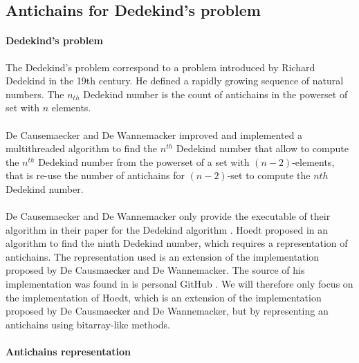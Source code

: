 \documentclass[11pt,a4paper]{article}
\theoremstyle{definition}
\begin{document}
\subsection{Antichains for Dedekind's problem}

\label{sota_hoedts}

\paragraph{Dedekind's problem}

The Dedekind's problem correspond to a problem introduced by Richard
Dedekind in the 19th century. He defined a rapidly growing sequence
of natural numbers. The $n_{th}$ Dedekind number is the count
of antichains in the powerset of set with $n$ elements.

\paragraph{}

De Causemaecker and De Wannemacker \cite{causemaecker1} improved and
implemented a multithreaded algorithm to find the $n^{th}$ Dedekind number
that allow to compute the $n^{th}$ Dedekind number from the powerset
of a set with $(n-2)$-elements, that is re-use the number of antichains
for $(n-2)$-set to compute the $n{th}$ Dedekind number.


\paragraph{}

De Causemaecker and De Wannemacker only provide the executable of
their algorithm in their paper for
the Dedekind algorithm \cite{causemaecker1}. Hoedt proposed in \cite{hoedt}
an algorithm to find the ninth Dedekind number, which requires a representation
of antichains. The representation used is an extension of the implementation
proposed by De Causmaecker and De Wannemacker. The source of his
implementation was found in is personal GitHub \cite{hoedt_src}.
We will therefore only focus on the implementation
of Hoedt, which is an extension of the implementation proposed
by De Causmaecker and De Wannemacker, but by representing an antichains
using bitarray-like methods.

\paragraph{Antichains representation}
\end{document}
